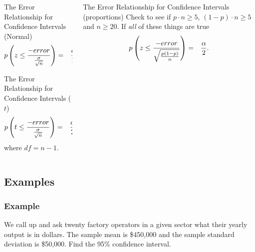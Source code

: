 \begin{frame}

  \begin{columns}[T]

    \begin{column}[T]{0.5\textwidth}
      \begin{block}{The Error Relationship for Confidence Intervals
          (Normal)}
        \begin{eqnarray*}
          p\left( z \leq \frac{-error}{\frac{\sigma}{\sqrt{n}}}\right) & = & \frac{\alpha}{2}.
        \end{eqnarray*}
      \end{block}

      \begin{block}{The Error Relationship for Confidence Intervals
          ($t$)}
        \begin{eqnarray*}
          p\left( t \leq \frac{-error}{\frac{\sigma}{\sqrt{n}}}\right) & = & \frac{\alpha}{2},
        \end{eqnarray*}
        where $df=n-1$.
      \end{block}
    \end{column}


    \begin{column}[T]{0.5\textwidth}
      \begin{block}{The Error Relationship for Confidence Intervals
          (proportions)}
        Check to see if $p\cdot n \geq 5$, $(1-p)\cdot n \geq 5$ and
        $n\geq 20$. If \textit{all} of these things are true
        \begin{eqnarray*}
          p\left( z \leq \frac{-error}{\sqrt{\frac{p(1-p)}{n}}} \right) & = & \frac{\alpha}{2}.
        \end{eqnarray*}
      \end{block}
    \end{column}
  \end{columns}
  
\end{frame}



\subsection{Examples}


\begin{frame}
  \frametitle{Example}

  We call up and ask twenty factory operators in a given sector what
  their yearly output is in dollars. The sample mean is \$450,000 and
  the sample standard deviation is \$50,000. Find the 95\% confidence
  interval.

  \vfill


  \vfill

\end{frame}


